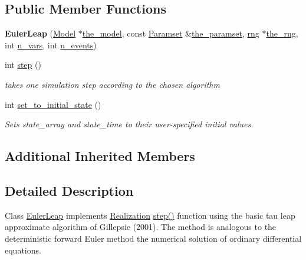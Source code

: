 \subsection*{Public Member Functions}
\begin{DoxyCompactItemize}
\item 
\mbox{\label{class_euler_leap_ae5db6ea05659798b624a28872799b906}} 
{\bfseries Euler\+Leap} (\hyperlink{class_model}{Model} $\ast$\hyperlink{class_realization_a47ec1d062b8caee874b08c1a17d6aeeb}{the\+\_\+model}, const \hyperlink{class_paramset}{Paramset} \&\hyperlink{class_realization_a119bb29de88929bc51bc1b329473a94b}{the\+\_\+paramset}, \hyperlink{classrng}{rng} $\ast$\hyperlink{class_realization_ac8d358d929afae90cf5790675b6744f9}{the\+\_\+rng}, int \hyperlink{class_realization_ad9951a0829e68e12fcb3817735bb5097}{n\+\_\+vars}, int \hyperlink{class_realization_afb711282bef806fc0020f91252d1df2c}{n\+\_\+events})
\item 
\mbox{\label{class_euler_leap_a25b1ea90a95bfd41ecb919605683da9d}} 
int \hyperlink{class_euler_leap_a25b1ea90a95bfd41ecb919605683da9d}{step} ()
\begin{DoxyCompactList}\small\item\em takes one simulation step according to the chosen algorithm \end{DoxyCompactList}\item 
int \hyperlink{class_euler_leap_a1a13929ea1ebf40e7357439968828f4b}{set\+\_\+to\+\_\+initial\+\_\+state} ()
\begin{DoxyCompactList}\small\item\em Sets state\+\_\+array and state\+\_\+time to their user-\/specified initial values. \end{DoxyCompactList}\end{DoxyCompactItemize}
\subsection*{Additional Inherited Members}


\subsection{Detailed Description}
Class \hyperlink{class_euler_leap}{Euler\+Leap} implements \hyperlink{class_realization}{Realization} \hyperlink{class_euler_leap_a25b1ea90a95bfd41ecb919605683da9d}{step()} function using the basic tau leap approximate algorithm of Gillepsie (2001). The method is analogous to the deterministic forward Euler method the numerical solution of ordinary differential equations. 

